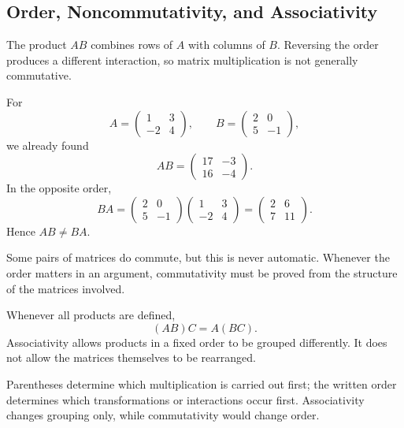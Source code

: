 \subsection{Order, Noncommutativity, and Associativity}

\begin{corebox}
The product $AB$ combines rows of $A$ with columns of $B$. Reversing the order
produces a different interaction, so matrix multiplication is not generally
commutative.
\end{corebox}

\begin{examplebox}
For
\[
A=\begin{pmatrix}1&3\\-2&4\end{pmatrix},
\qquad
B=\begin{pmatrix}2&0\\5&-1\end{pmatrix},
\]
we already found
\[
AB=\begin{pmatrix}17&-3\\16&-4\end{pmatrix}.
\]
In the opposite order,
\[
BA=
\begin{pmatrix}2&0\\5&-1\end{pmatrix}
\begin{pmatrix}1&3\\-2&4\end{pmatrix}
=
\begin{pmatrix}2&6\\7&11\end{pmatrix}.
\]
Hence $AB\neq BA$.
\end{examplebox}

\begin{remarkbox}
Some pairs of matrices do commute, but this is never automatic. Whenever the
order matters in an argument, commutativity must be proved from the structure of
the matrices involved.
\end{remarkbox}

\begin{theorembox}[Associativity]
Whenever all products are defined,
\[
(AB)C=A(BC).
\]
Associativity allows products in a fixed order to be grouped differently. It does
not allow the matrices themselves to be rearranged.
\end{theorembox}

\begin{interpretationbox}
Parentheses determine which multiplication is carried out first; the written
order determines which transformations or interactions occur first. Associativity
changes grouping only, while commutativity would change order.
\end{interpretationbox}
